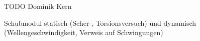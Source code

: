 TODO Dominik Kern

\bigskip

Schubmodul statisch (Scher-, Torsionsversuch) und dynamisch (Wellengeschwindigkeit, Verweis auf Schwingungen) 





